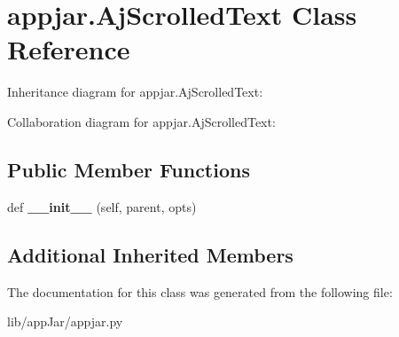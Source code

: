 \hypertarget{classappjar_1_1_aj_scrolled_text}{}\section{appjar.\+Aj\+Scrolled\+Text Class Reference}
\label{classappjar_1_1_aj_scrolled_text}


Inheritance diagram for appjar.\+Aj\+Scrolled\+Text\+:


Collaboration diagram for appjar.\+Aj\+Scrolled\+Text\+:
\subsection*{Public Member Functions}
\begin{DoxyCompactItemize}
\item 
\mbox{\label{classappjar_1_1_aj_scrolled_text_aba9c5678de87cd91797da7a4ec7cad03}} 
def {\bfseries \+\_\+\+\_\+init\+\_\+\+\_\+} (self, parent, opts)
\end{DoxyCompactItemize}
\subsection*{Additional Inherited Members}


The documentation for this class was generated from the following file\+:\begin{DoxyCompactItemize}
\item 
lib/app\+Jar/appjar.\+py\end{DoxyCompactItemize}
